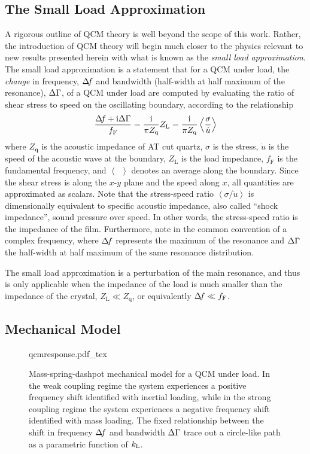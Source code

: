 \subsection{The Small Load Approximation}
A rigorous outline of QCM theory is well beyond the scope of this work.
Rather, the introduction of QCM theory will begin much closer to the
physics relevant to new results presented herein with what is known as the
\textit{small load approximation}.  The small load approximation is a
statement that for a QCM under load, the \textit{change} in frequency,
$\Delta\!f$ and bandwidth (half-width at half maximum of the resonance), $\Delta\Gamma$,
of a QCM under load are computed by evaluating the ratio of shear stress to
speed on the oscillating boundary, according to the
relationship~\cite{eggers1987method}~\cite{johannsmann1992viscoelastic}
\begin{equation}
 \frac{\Delta\!f+{\mathrm{i}}\Delta\Gamma}{f_{\mathrm{F}}}=\frac{{\mathrm{i}}}{\pi Z_{\mathrm{q}}}Z_\mathrm{L} =\frac{{\mathrm{i}}}{\pi Z_{\mathrm{q}}}\left<\frac{\sigma}{\dot{u}}\right>
\label{eqn:comsolextract}
\end{equation}
where $Z_\mathbf{q}$ is the acoustic impedance of AT cut quartz, $\sigma$
is the stress, $\dot{u}$ is the speed of the acoustic wave at the
boundary, $Z_\mathrm{L}$ is the load impedance, $f_{\mathrm{F}}$ is the
fundamental frequency, and $\left<\enspace\right>$ denotes an average
along the boundary.  Since the shear stress is along the $x$-$y$ plane and
the speed along $x$, all quantities are approximated as scalars.
Note that the stress-speed ratio
$\left<\sigma/\dot{u}\right>$ is dimensionally equivalent to specific
acoustic impedance, also called ``shock impedance'', sound pressure over
speed.  In other words, the stress-speed ratio is the impedance of the
film.  Furthermore, note in  the common
convention of a complex frequency, where $\Delta\!f$ represents the maximum of
the resonance and $\Delta\Gamma$ the half-width at half maximum of the same
resonance distribution.

The small load approximation is a perturbation of the main resonance, and
thus is only applicable when the impedance of the load is much smaller than
the impedance of the crystal, $Z_\mathrm{L} \ll Z_\mathrm{q}$, or
equivalently $\Delta\!f \ll f_\mathrm{F}$.

\subsection{Mechanical Model}
\begin{figure}
\centering
{qcmresponse.pdf_tex}
\caption{Mass-spring-dashpot mechanical model for a QCM under load. In the
weak coupling regime the system experiences a positive frequency shift
identified with inertial loading, while in the strong coupling regime the
system experiences a negative frequency shift identified with mass loading.
The fixed relationship between the shift in frequency $\Delta\!f$ and bandwidth
$\Delta\Gamma$ trace out a circle-like path as a parametric function of $k_\mathrm{L}$.}
\label{fig:mechanicalmodel}
\end{figure}

